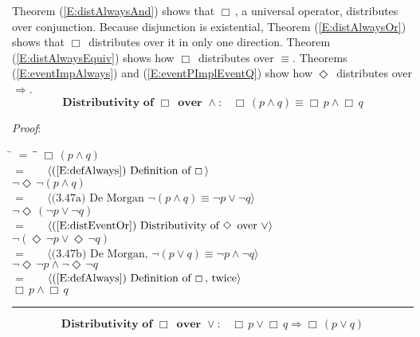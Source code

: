 \documentclass[12pt, fleqn, leqno]{article}
\newcommand{\lgap}{2pt}                             %
\newcommand{\mymathindent}{24pt}                    %
\newcommand{\impl}{\ensuremath{\Rightarrow}}        %
\newcommand{\Event}{\Diamond\,}
\newcommand{\Always}{\Box\,}
\newcommand{\myqed}{\rule[-.23ex]{1.2ex}{2.0ex}}
\newcommand{\myqedtab}{\hspace{384pt}}              %
\newcommand{\Gll} {\langle}                         %
\newcommand{\Ggg} {\rangle}                         %
\newcommand{\Hint}[1]     {\ \ \ $\Gll              \mbox{#1} \Ggg$ }   %
\begin{document}
Theorem (\ref{E:distAlwaysAnd}) shows that $\Always$, a universal operator, distributes over conjunction.
Because disjunction is existential, Theorem (\ref{E:distAlwaysOr}) shows that $\Always$ distributes over it in only one
direction.
Theorem (\ref{E:distAlwaysEquiv}) shows how $\Always$ distributes over $\equiv$.
Theorems  (\ref{E:eventImpAlways}) and (\ref{E:eventPImplEventQ}) show how $\Event$ distributes over $\impl$.
\begin{equation}\label{E:distAlwaysAnd}
\textbf{Distributivity of $\Always$ over $\land$:}\quad \Always (p \land q) \equiv \Always p \land \Always q
\end{equation}

\emph{Proof}:
\begin{tabbing}
\hspace{\mymathindent} \= $= \;$ \= \myqedtab \= \kill
  \> \>   $\Always (p \land q)$\\[\lgap]
  \> $=$  \>  \Hint{(\ref{E:defAlways}) Definition of $\Always$}\\[\lgap]
  \> \>   $\neg\Event\neg (p \land q)$\\[\lgap]
  \> $=$  \>  \Hint{(3.47a) De Morgan $\neg (p \land q) \equiv \neg p \lor \neg q$}\\[\lgap]
  \> \>   $\neg\Event (\neg p \lor \neg q)$\\[\lgap]
  \> $=$  \>  \Hint{(\ref{E:distEventOr}) Distributivity of $\Event$ over $\lor$}\\[\lgap]
  \> \>   $\neg (\Event\neg p \lor \Event\neg q)$\\[\lgap]
  \> $=$  \>  \Hint{(3.47b) De Morgan, $\neg (p \lor q) \equiv \neg p \land \neg q$}\\[\lgap]
  \> \>   $\neg\Event\neg p \land \neg\Event\neg q$\\[\lgap]
  \> $=$  \>  \Hint{(\ref{E:defAlways}) Definition of $\Always$, twice}\\[\lgap]
  \> \>   $\Always p \land \Always q$ \quad \myqed
\end{tabbing}
\begin{equation}\label{E:distAlwaysOr}
\textbf{Distributivity of $\Always$ over $\lor$:}\quad \Always p \lor \Always q \impl \Always (p \lor q)
\end{equation}
\end{document}
